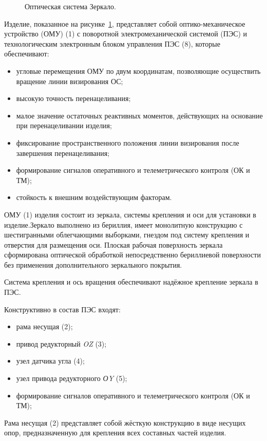 \begin{figure}[ht] 
	\caption{Оптическая система Зеркало.}
	\label{fig:zerkalo} 
\end{figure}

Изделие, показанное на рисунке~\cref{fig:zerkalo}, представляет собой оптико-механическое устройство (ОМУ) (1) с поворотной электромеханической системой (ПЭС) и технологическим электронным блоком управления ПЭС (8), которые обеспечивают:
\begin{itemize}[beginpenalty=10000] %
	\item угловые перемещения ОМУ по двум координатам, позволяющие осуществить вращение линии визирования ОС;
	\item высокую точность перенацеливания;
	\item малое значение остаточных реактивных моментов, действующих на основание при перенацеливании изделия;
	\item фиксирование пространственного положения линии визирования после завершения перенацеливания;
	\item формирование сигналов оперативного и телеметрического контроля (ОК и ТМ);
	\item стойкость к внешним воздействующим факторам.
\end{itemize}

ОМУ (1) изделия состоит из зеркала, системы крепления и оси для установки в изделие.Зеркало выполнено из бериллия, имеет монолитную конструкцию с шестигранными облегчающими выборками, гнездом под систему крепления и отверстия для размещения оси. Плоская рабочая поверхность зеркала сформирована оптической обработкой непосредственно бериллиевой поверхности без применения дополнительного зеркального покрытия.

Система крепления и ось вращения обеспечивают надёжное крепление зеркала в ПЭС.

Конструктивно в состав ПЭС входят:
\begin{itemize}[beginpenalty=10000] %
	\item рама несущая (2);
	\item привод редукторный \textit{OZ} (3);
	\item узел датчика угла (4);
	\item узел привода редукторного \textit{ОY} (5);
	\item формирование сигналов оперативного и телеметрического контроля (ОК и ТМ);
\end{itemize}
Рама несущая (2) представляет собой жёсткую конструкцию в виде несущих опор, предназначенную для крепления всех составных частей изделия.

